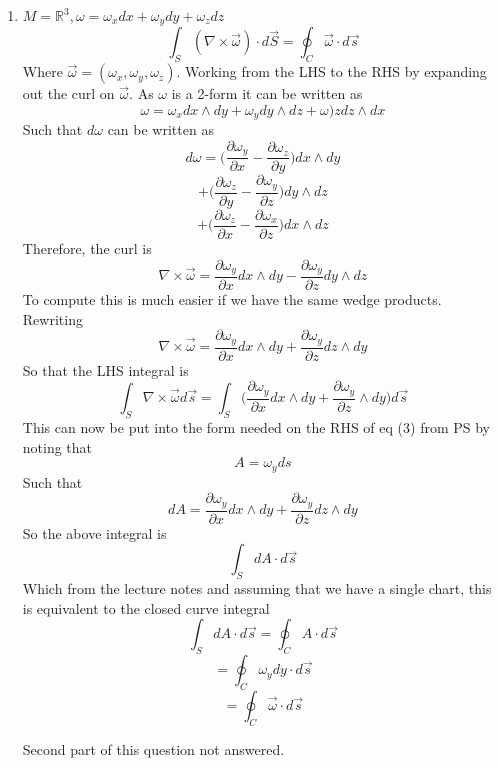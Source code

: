 \documentclass[12pt]{article}
\begin{document}
\begin{enumerate}
\item $M = \mathbb{R}^3, \omega = \omega_x dx + \omega_y dy + \omega_z dz$ 
$$ \int_S (\nabla \times \vec{\omega})\cdot d\vec{S}= \oint_C \vec{\omega}\cdot d\vec{s} $$
Where $\vec{\omega} = (\omega_x, \omega_y, \omega_z ) $. Working from the LHS to the RHS by expanding out the curl on $\vec{\omega}$. As $\omega$ is a 2-form it can be written as 
$$ \omega = \omega_x dx \wedge dy + \omega_y dy \wedge dz + \omega)z dz \wedge dx $$
Such that $d \omega$ can be written as 
$$ d \omega = \Big( \frac{\partial \omega_y}{\partial x} - \frac{\partial \omega_z}{\partial y} \Big) dx \wedge dy $$
$$ + \Big( \frac{\partial \omega_z}{\partial y} - \frac{\partial \omega_y}{\partial z} \Big) dy \wedge dz $$
$$ + \Big( \frac{\partial \omega_z}{\partial x} - \frac{\partial \omega_x }{\partial z } \Big) dx \wedge dz $$ 
Therefore, the curl is 
$$ \nabla \times \vec{\omega} = \frac{\partial \omega_y}{\partial x} dx \wedge dy - \frac{\partial \omega_y}{\partial z} dy \wedge dz $$
To compute this is much easier if we have the same wedge products. Rewriting 
$$ \nabla \times \vec{\omega} = \frac{\partial \omega_y}{\partial x} dx \wedge dy + \frac{\partial \omega_y}{\partial z} dz \wedge dy $$
So that the LHS integral is 
$$ \int_S \nabla \times \vec{\omega} d \vec{s} = \int_S \Big( \frac{\partial \omega_y}{\partial x} dx \wedge dy + \frac{\partial \omega_y}{\partial z} \wedge dy \Big) d \vec{s} $$
This can now be put into the form needed on the RHS of eq (3) from PS by noting that 
$$ A = \omega_y d s $$
Such that 
$$ dA = \frac{\partial \omega_y}{\partial x} dx \wedge dy + \frac{\partial \omega_y}{\partial z} dz \wedge dy $$
So the above integral is 
$$ \int_S dA \cdot d \vec{s} $$
Which from the lecture notes and assuming that we have a single chart, this is equivalent to the closed curve integral 
$$ \int_S dA \cdot d \vec{s} = \oint_C A \cdot d \vec{s} $$
$$ = \oint_C \omega_y dy \cdot d \vec{s} $$
$$ = \oint_C \vec{\omega}\cdot d\vec{s} $$

Second part of this question not answered.




\end{enumerate}
\end{document}

